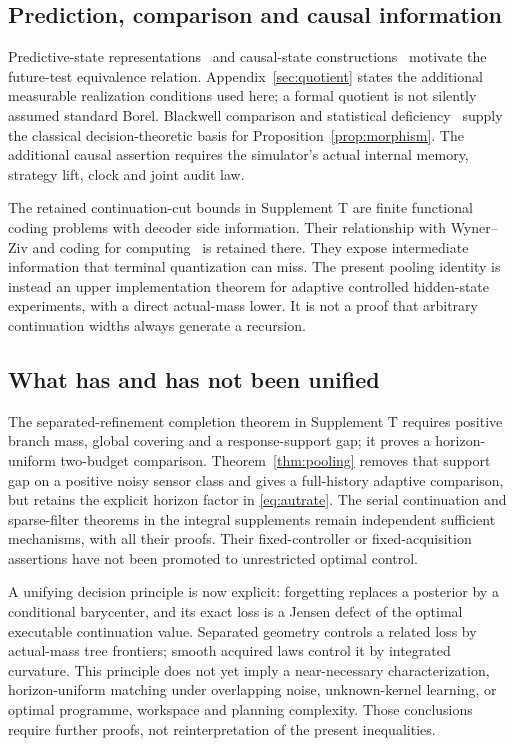 \subsection{Prediction, comparison and causal information}
Predictive-state representations~\cite{psr} and causal-state constructions~\cite{shalizi} motivate the future-test equivalence relation. Appendix~\ref{sec:quotient} states the additional measurable realization conditions used here; a formal quotient is not silently assumed standard Borel. Blackwell comparison and statistical deficiency~\cite{blackwell,lecam} supply the classical decision-theoretic basis for Proposition~\ref{prop:morphism}. The additional causal assertion requires the simulator's actual internal memory, strategy lift, clock and joint audit law.

The retained continuation-cut bounds in Supplement T are finite functional coding problems with decoder side information. Their relationship with Wyner--Ziv and coding for computing~\cite{wynerziv,orlitsky} is retained there. They expose intermediate information that terminal quantization can miss. The present pooling identity is instead an upper implementation theorem for adaptive controlled hidden-state experiments, with a direct actual-mass lower. It is not a proof that arbitrary continuation widths always generate a recursion.

\subsection{What has and has not been unified}
The separated-refinement completion theorem in Supplement T requires positive branch mass, global covering and a response-support gap; it proves a horizon-uniform two-budget comparison. Theorem~\ref{thm:pooling} removes that support gap on a positive noisy sensor class and gives a full-history adaptive comparison, but retains the explicit horizon factor in \eqref{eq:autrate}. The serial continuation and sparse-filter theorems in the integral supplements remain independent sufficient mechanisms, with all their proofs. Their fixed-controller or fixed-acquisition assertions have not been promoted to unrestricted optimal control.

A unifying decision principle is now explicit: forgetting replaces a posterior by a conditional barycenter, and its exact loss is a Jensen defect of the optimal executable continuation value. Separated geometry controls a related loss by actual-mass tree frontiers; smooth acquired laws control it by integrated curvature. This principle does not yet imply a near-necessary characterization, horizon-uniform matching under overlapping noise, unknown-kernel learning, or optimal programme, workspace and planning complexity. Those conclusions require further proofs, not reinterpretation of the present inequalities.

